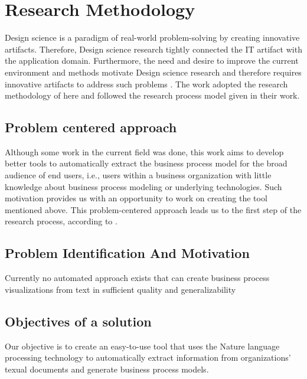 \chapter{Research Methodology}

Design science is a paradigm of real-world problem-solving by creating innovative artifacts. Therefore, Design science research tightly connected the IT artifact with the application domain. Furthermore, the need and desire to improve the current environment and methods motivate Design science research and therefore requires innovative artifacts to address such problems \cite{DSM_1}. The work adopted the research methodology of \cite{DSM_2} here and followed the research process model given in their work.

\section{Problem centered approach}
Although some work in the current field was done, this work aims to develop better tools to automatically extract the business process model for the broad audience of end users, i.e., users within a business organization with little knowledge about business process modeling or underlying technologies. Such motivation provides us with an opportunity to work on creating the tool mentioned above. This problem-centered approach leads us to the first step of the research process, according to \cite{DSM_2}.

\section{Problem Identification And Motivation}
Currently no automated approach exists that can create business process
visualizations from text in sufficient quality and generalizability


\section{Objectives of a solution}
Our objective is to create an easy-to-use tool that uses the Nature language processing technology to automatically extract information from organizations' texual documents and generate business process models.


